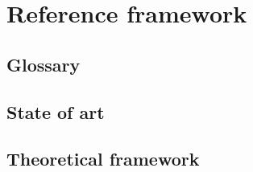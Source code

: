 \section{Reference framework}

\subsection{Glossary}

\subsection{State of art}

\subsection{Theoretical framework}
